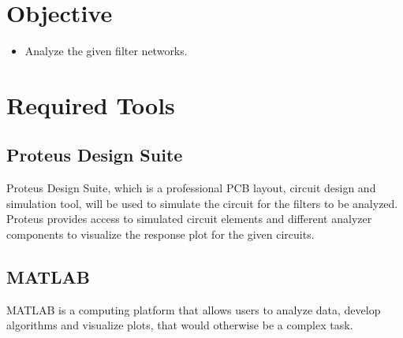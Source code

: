 \documentclass{lab_sheet}
\begin{document}
\clearpage
\tableofcontents
\clearpage
\listoffigures
\clearpage
\lstlistoflistings
\clearpage
\listoftables
\clearpage
{}
\section{Objective}
\begin{itemize}
   \item Analyze the given filter networks.
\end{itemize}


\section{Required Tools}
\subsection{Proteus Design Suite}
Proteus Design Suite, which is a professional PCB layout, circuit design and simulation tool, will be used to
simulate the circuit for the filters to be analyzed. Proteus provides access to simulated circuit elements
and different analyzer components to visualize the response plot for the given circuits.

\subsection{MATLAB}
MATLAB is a computing platform that allows users to analyze data, develop algorithms and visualize plots, that would otherwise be a complex task.
\end{document}
